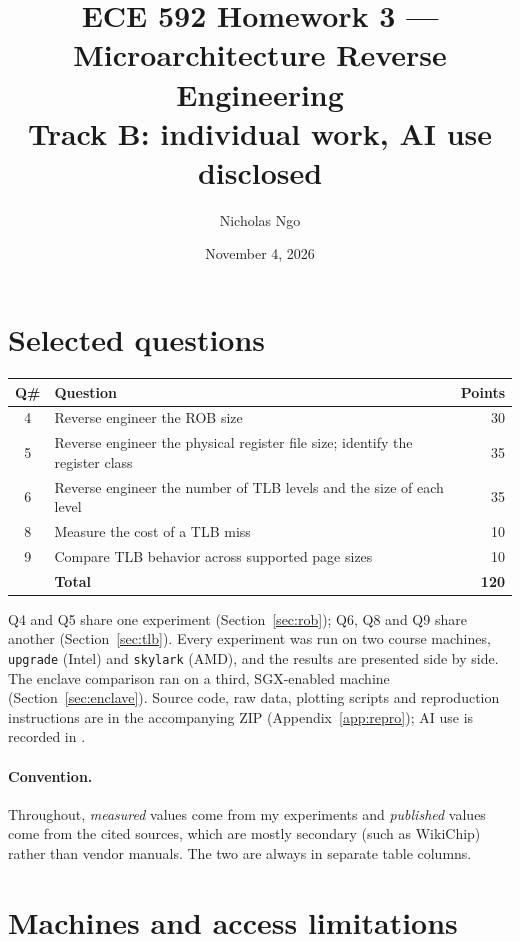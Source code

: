 \documentclass[11pt]{article}
\title{ECE 592 Homework 3 --- Microarchitecture Reverse Engineering\\[0.3em]
\large Track B: individual work, AI use disclosed}
\author{Nicholas Ngo}
\date{November 4, 2026}
\newcommand{\up}{\texttt{upgrade}}
\newcommand{\sk}{\texttt{skylark}}
\newcommand{\file}[1]{\texttt{\detokenize{#1}}}
\begin{document}
\maketitle

\section*{Selected questions}

\begin{center}
\begin{tabular}{clr}
\toprule
Q\# & Question & Points \\
\midrule
4 & Reverse engineer the ROB size & 30 \\
5 & Reverse engineer the physical register file size; identify the register class & 35 \\
6 & Reverse engineer the number of TLB levels and the size of each level & 35 \\
8 & Measure the cost of a TLB miss & 10 \\
9 & Compare TLB behavior across supported page sizes & 10 \\
\midrule
 & \textbf{Total} & \textbf{120} \\
\bottomrule
\end{tabular}
\end{center}

Q4 and Q5 share one experiment (Section~\ref{sec:rob}); Q6, Q8 and Q9 share
another (Section~\ref{sec:tlb}). Every experiment was run on two course
machines, \up{} (Intel) and \sk{} (AMD), and the results are presented side by
side. The enclave comparison ran on a third, SGX-enabled machine
(Section~\ref{sec:enclave}). Source code, raw data, plotting scripts and reproduction instructions
are in the accompanying ZIP (Appendix~\ref{app:repro}); AI use is recorded in
\file{AI_LOG.md}.

\paragraph{Convention.} Throughout, \emph{measured} values come from my
experiments and \emph{published} values come from the cited sources, which are
mostly secondary (such as WikiChip) rather than vendor manuals. The two are
always in separate table columns.

\section{Machines and access limitations}
\label{sec:machines}
\end{document}
